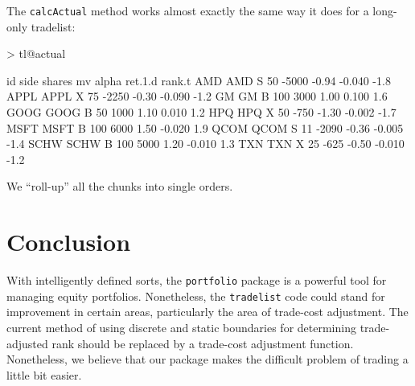 \documentclass{article}
\begin{document}
The \texttt{calcActual} method works almost exactly the same way it
does for a long-only tradelist: 

\begin{Schunk}
\begin{Sinput}
> tl@actual
\end{Sinput}
\begin{Soutput}
       id side shares    mv alpha ret.1.d rank.t
AMD   AMD    S     50 -5000 -0.94  -0.040   -1.8
APPL APPL    X     75 -2250 -0.30  -0.090   -1.2
GM     GM    B    100  3000  1.00   0.100    1.6
GOOG GOOG    B     50  1000  1.10   0.010    1.2
HPQ   HPQ    X     50  -750 -1.30  -0.002   -1.7
MSFT MSFT    B    100  6000  1.50  -0.020    1.9
QCOM QCOM    S     11 -2090 -0.36  -0.005   -1.4
SCHW SCHW    B    100  5000  1.20  -0.010    1.3
TXN   TXN    X     25  -625 -0.50  -0.010   -1.2
\end{Soutput}
\end{Schunk}

We ``roll-up'' all the chunks into single orders.

\section{Conclusion}

With intelligently defined sorts, the \texttt{portfolio} package is a
powerful tool for managing equity portfolios.  Nonetheless, the
\texttt{tradelist} code could stand for improvement in certain areas,
particularly the area of trade-cost adjustment.  The current method of
using discrete and static boundaries for determining trade-adjusted
rank should be replaced by a trade-cost adjustment function.
Nonetheless, we believe that our package makes the difficult problem
of trading a little bit easier.
\end{document}
